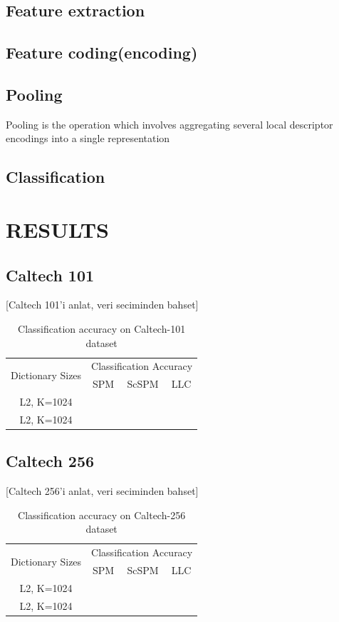 \documentclass[conference]{IEEEtran}
\begin{document}
\subsection {Feature extraction}
\subsection {Feature coding(encoding)}
\subsection {Pooling}
Pooling is the operation
which involves aggregating several local descriptor encodings
into a single representation
\subsection {Classification}

\clearpage

\section{RESULTS}

\subsection{Caltech 101}

[Caltech 101'i anlat, veri seciminden bahset]

\begin{table}[ph]
  \centering
  \begin{tabular}{|c|c|c|c|}
    \hline
    \multirow{2}{*}{Dictionary Sizes} & \multicolumn{3}{c|}{Classification Accuracy} \\
    \cline{2-4}
    & SPM & ScSPM & LLC \\
    \hline
     L2, K=1024 & & & \\
    \hline
     L2, K=1024 & & & \\
    \hline
  \end{tabular}
  \caption{Classification accuracy on Caltech-101 dataset }
  \label{tablo}
\end{table}

\subsection{Caltech 256} 

[Caltech 256'i anlat, veri seciminden bahset]

\begin{table}[ph]
  \centering
  \begin{tabular}{|c|c|c|c|}
    \hline
    \multirow{2}{*}{Dictionary Sizes} & \multicolumn{3}{c|}{Classification Accuracy} \\
    \cline{2-4}
    & SPM & ScSPM & LLC \\
    \hline
     L2, K=1024 & & & \\
    \hline
     L2, K=1024 & & & \\
    \hline
  \end{tabular}
  \caption{Classification accuracy on Caltech-256 dataset }
  \label{tablo}
\end{table}
\end{document}
